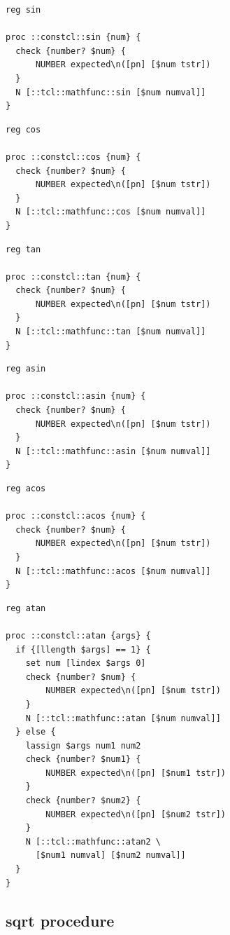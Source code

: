 \documentclass[a5paper,draft]{memoir}
\begin{document}
\begin{lstlisting}
reg sin

proc ::constcl::sin {num} {
  check {number? $num} {
      NUMBER expected\n([pn] [$num tstr])
  }
  N [::tcl::mathfunc::sin [$num numval]]
}
\end{lstlisting}

\begin{lstlisting}
reg cos

proc ::constcl::cos {num} {
  check {number? $num} {
      NUMBER expected\n([pn] [$num tstr])
  }
  N [::tcl::mathfunc::cos [$num numval]]
}
\end{lstlisting}

\begin{lstlisting}
reg tan

proc ::constcl::tan {num} {
  check {number? $num} {
      NUMBER expected\n([pn] [$num tstr])
  }
  N [::tcl::mathfunc::tan [$num numval]]
}
\end{lstlisting}

\begin{lstlisting}
reg asin

proc ::constcl::asin {num} {
  check {number? $num} {
      NUMBER expected\n([pn] [$num tstr])
  }
  N [::tcl::mathfunc::asin [$num numval]]
}
\end{lstlisting}

\begin{lstlisting}
reg acos

proc ::constcl::acos {num} {
  check {number? $num} {
      NUMBER expected\n([pn] [$num tstr])
  }
  N [::tcl::mathfunc::acos [$num numval]]
}
\end{lstlisting}

\begin{lstlisting}
reg atan

proc ::constcl::atan {args} {
  if {[llength $args] == 1} {
    set num [lindex $args 0]
    check {number? $num} {
        NUMBER expected\n([pn] [$num tstr])
    }
    N [::tcl::mathfunc::atan [$num numval]]
  } else {
    lassign $args num1 num2
    check {number? $num1} {
        NUMBER expected\n([pn] [$num1 tstr])
    }
    check {number? $num2} {
        NUMBER expected\n([pn] [$num2 tstr])
    }
    N [::tcl::mathfunc::atan2 \
      [$num1 numval] [$num2 numval]]
  }
}
\end{lstlisting}

\subsection{sqrt procedure}
\label{sqrt-procedure}
\end{document}
